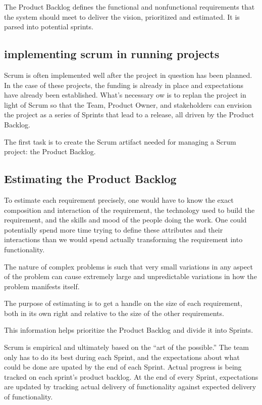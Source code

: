 The Product Backlog defines the functional and nonfunctional requirements that the system should meet to deliver the vision, prioritized and estimated. It is parsed into potential sprints.





\subsection{implementing scrum in running projects}

Scrum is often implemented well after the project in question has been planned. In the case of these projects, the funding is already in place and expectations have already been established. What’s necessary  ow is to replan the project in light of Scrum so that the Team, Product Owner, and stakeholders can envision the project as a series of Sprints that lead to a release, all driven by the Product Backlog.


The first task is to create the Scrum artifact needed for managing a Scrum project: the Product Backlog.

\subsection{Estimating the Product Backlog}

To estimate each requirement precisely, one would have to know the exact composition and interaction of the requirement, the technology used to build the requirement, and the skills and mood of the people doing the work. One could potentially spend more time trying to define these attributes and their interactions than we would spend actually transforming the requirement into functionality.

The nature of complex problems is such that very small variations in any aspect of the problem can cause extremely large and unpredictable variations in how the problem manifests itself.

The purpose of estimating is to get a handle on the size of each requirement, both in its own right and relative to the size of the other requirements.

This information helps prioritize the Product Backlog and divide it into Sprints.

Scrum is empirical and ultimately based on the “art of the possible.” The team only has to do its best during each Sprint, and the expectations about what could be done are upated by the end of each Sprint.
Actual progress is being tracked on each sprint's product backlog. At the end of every Sprint, expectations are updated by tracking actual delivery of functionality against expected delivery of functionality.

